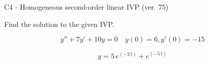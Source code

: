 \begin{exercise}
  \begin{exerciseTitle}C4 - Homogeneous second-order linear IVP (ver. 75)\end{exerciseTitle}
  \begin{exerciseStatement}
    
Find the solution to the given IVP.

    
\[y''+7y'+10y = 0 \hspace{1em} y(0) = 6 , y'(0) = -15\]

  \end{exerciseStatement}
  \begin{exerciseAnswer}
    
\[y= 5 \, e^{\left(-2 \, t\right)} + e^{\left(-5 \, t\right)}\]

  \end{exerciseAnswer}
\end{exercise}